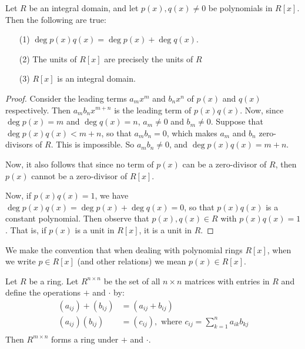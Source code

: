 \begin{theorem}\label{theorem_5.2.2}
    Let $R$ be an integral domain, and let  $p(x),q(x) \neq 0$ be polynomials in
    $R[x]$. Then the following are true:
    \begin{enumerate}
        \item[(1)] $\deg{p(x)q(x)}=\deg{p(x)}+\deg{q(x)}$.

        \item[(2)] The units of $R[x]$ are precisely the units of $R$

        \item[(3)] $R[x]$ is an integral domain.
    \end{enumerate}
\end{theorem}
\begin{proof}
  Consider the leading terms $a_mx^m$ and  $b_nx^n$ of $p(x)$ and
  $q(x)$ respectively. Then $a_mb_nx^{m+n}$ is the leading term of
  $p(x)q(x)$. Now, since $\deg{p(x)}=m$ and $\deg{q(x)}=n$, $a_m \neq
  0$ and $b_m \neq 0$. Suppose that $\deg{p(x)q(x)}<m+n$, so that
  $a_mb_n=0$, which makes $a_m$ and $b_n$ zero-divisors of $R$. This
  is impossible. So $a_mb_n \neq 0$, and $\deg{p(x)q(x)}=m+n$.

  Now, it also follows that since no term of $p(x)$ can be a
  zero-divisor of $R$, then $p(x)$ cannot be a zero-divisor of $R[x]$.

  Now, if $p(x)q(x)=1$, we have
  $\deg{p(x)q(x)}=\deg{p(x)}+\deg{q(x)}=0$, so that $p(x)q(x)$ is a
  constant polynomial. Then observe that $p(x),q(x) \in R$ with
  $p(x)q(x)=1$. That is, if $p(x)$ is a unit in $R[x]$, it is a unit in $R$.
\end{proof}

\begin{remark}
  We make the convention that when dealing with polynomial rings
  $R[x]$, when we write $p \in R[x]$ (and other relations) we mean
  $p(x) \in R[x]$.
\end{remark}

\begin{theorem}\label{theorem_5.2.3}
    Let $R$ be a ring. Let  $R^{n \times n}$ be the set of all $n \times n$
    matrices with entries in $R$ and define the operations $+$ and  $\cdot$ by:
    \begin{align*}
        (a_{ij})+(b_{ij})   &= (a_{ij}+b_{ij})  \\
        (a_{ij})(b_{ij})    &=  (c_{ij}), \text{ where }
        c_{ij}=\sum_{k=1}^n{a_{ik}b_{kj}}   \\
    \end{align*}
    Then $R^{m \times n}$ forms a ring under $+$ and $\cdot$.
\end{theorem}

